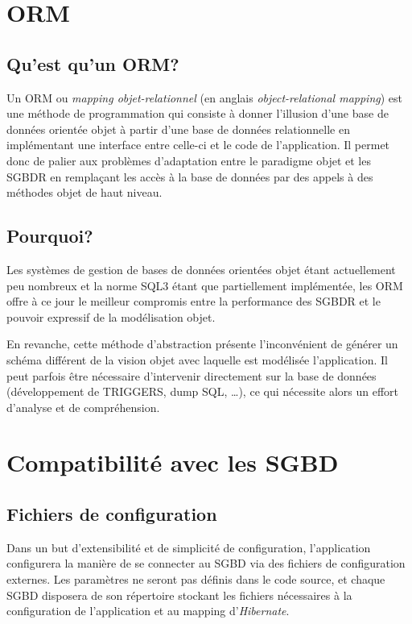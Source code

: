 \section{ORM}

	\subsection{Qu'est qu'un ORM?}
    Un ORM ou \emph{mapping objet-relationnel} (en anglais \emph{object-relational mapping}) est une méthode de programmation qui consiste à donner l'illusion d'une base de données orientée objet à partir d'une base de données relationnelle en implémentant une interface entre celle-ci et le code de l'application. Il permet donc de palier aux problèmes d'adaptation entre le paradigme objet et les SGBDR en remplaçant les accès à la base de données par des appels à des méthodes objet de haut niveau.
   
	\subsection{Pourquoi?}
    Les systèmes de gestion de bases de données orientées objet étant actuellement peu nombreux et la norme SQL3 étant que partiellement implémentée, les ORM offre à ce jour le meilleur compromis entre la performance des SGBDR et le pouvoir expressif de la modélisation objet.
    
En revanche, cette méthode d'abstraction présente l'inconvénient de générer un schéma différent de la vision objet avec laquelle est modélisée l'application. Il peut parfois être nécessaire d'intervenir directement sur la base de données (développement de TRIGGERS, dump SQL, \ldots), ce qui nécessite alors un effort d'analyse et de compréhension.

\section{Compatibilité avec les SGBD}
	\subsection{Fichiers de configuration}
	Dans un but d'extensibilité et de simplicité de configuration, l'application configurera la manière de se connecter au SGBD via des fichiers de configuration externes. Les paramètres ne seront pas définis dans le code source, et chaque SGBD disposera de son répertoire stockant les fichiers nécessaires à la configuration de l'application et au mapping d'\emph{Hibernate}.

